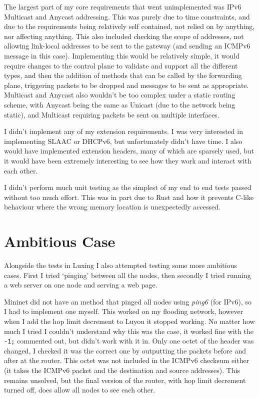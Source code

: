 \documentclass[12pt,a4paper,twoside,openright]{report}
\begin{document}
The largest part of my core requirements that went unimplemented was IPv6 Multicast and Anycast addressing.  This was purely due to time constraints, and due to the requirements being relatively self contained, not relied on by anything, nor affecting anything.  This also included checking the scope of addresses, not allowing link-local addresses to be sent to the gateway (and sending an ICMPv6 message in this case).  Implementing this would be relatively simple, it would require changes to the control plane to validate and support all the different types, and then the addition of methods that can be called by the forwarding plane, triggering packets to be dropped and messages to be sent as appropriate. Multicast and Anycast also wouldn't be too complex under a static routing scheme, with Anycast being the same as Unicast (due to the network being static), and Multicast requiring packets be sent on multiple interfaces.

\bigskip

I didn't implement any of my extension requirements.  I was very interested in implementing SLAAC or DHCPv6, but unfortunately didn't have time.  I also would have implemented extension headers, many of which are sparsely used, but it would have been extremely interesting to see how they work and interact with each other.

\bigskip

I didn't perform much unit testing as the simplest of my end to end tests passed without too much effort.  This was in part due to Rust and how it prevents C-like behaviour where the wrong memory location is unexpectedly accessed.

\section{Ambitious Case}

Alongside the tests in Luxing I also attempted testing some more ambitious cases.  First I tried `pinging' between all the nodes, then secondly I tried running a web server on one node and serving a web page.

\bigskip

Mininet did not have an method that pinged all nodes using \textit{ping6} (for IPv6), so I had to implement one myself.  This worked on my flooding network, however when I add the hop limit decrement to Luyou it stopped working. No matter how much I tried I couldn't understand why this was the case, it worked fine with the \verb!-1;! commented out, but didn't work with it in. Only one octet of the header was changed, I checked it was the correct one by outputting the packets before and after at the router.  This octet was not included in the ICMPv6 checksum either (it takes the ICMPv6 packet and the destination and source addresses).  This remains unsolved, but the final version of the router, with hop limit decrement turned off, does allow all nodes to see each other.
\end{document}
